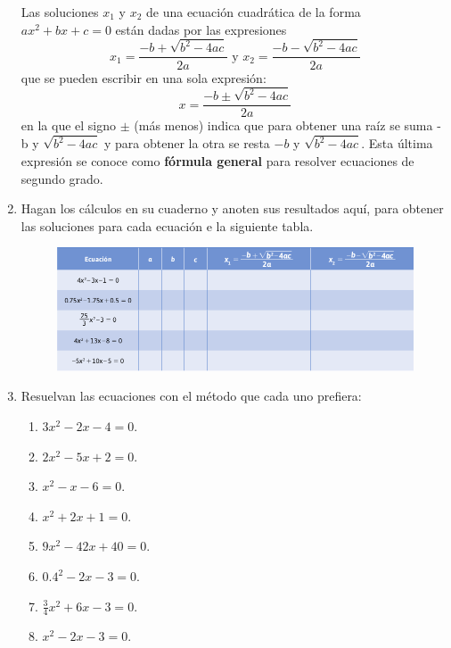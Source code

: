 \documentclass[11pt]{book}
\begin{document}
\begin{enumerate}
        \begin{boxH}
          Las soluciones $x_1$ y $x_2$ de una ecuación cuadrática de la forma $ax^2 + bx + c = 0$ están dadas por las expresiones
          \[ x_1= \dfrac{-b+\sqrt{b^2-4ac}}{2a} \text{ y }  x_2= \dfrac{-b-\sqrt{b^2-4ac}}{2a}\]
          que se pueden escribir en una sola expresión:
          \[x= \dfrac{-b\pm\sqrt{b^2-4ac}}{2a}\]
          en la que el signo $\pm$ (más menos) indica que para obtener una raíz se suma - b y
          $\sqrt{b^2 - 4ac}$ y para obtener la otra se resta $- b$ y $\sqrt{b^2 - 4ac}$. Esta última expresión se
          conoce como \textbf{fórmula general} para resolver ecuaciones de segundo grado.
        \end{boxH}

        \newpage

  \item Hagan los cálculos en su cuaderno y anoten sus resultados aquí, para obtener las soluciones para cada ecuación e la siguiente tabla.

        \begin{figure}[H]
          \centering
          \includegraphics[width=\textwidth]{table2.10.png}
          \label{tab:table2.10}
        \end{figure}

  \item Resuelvan las ecuaciones con el método que cada uno prefiera:

        \begin{enumerate}
          \item $3x^2  - 2x - 4 = 0$.
          \item $2x^2 - 5x + 2 = 0$.
          \item $x^2 - x - 6 = 0$.
          \item $x^2 + 2x + 1 = 0$.
          \item $9x^2 - 42x + 40 = 0$.
          \item $0.4^2 - 2x - 3 = 0$.
          \item $\frac{3}{4}x^2 + 6x - 3 = 0$.
          \item $x^2 - 2x - 3 = 0$.
        \end{enumerate}


\end{enumerate}
\end{document}
